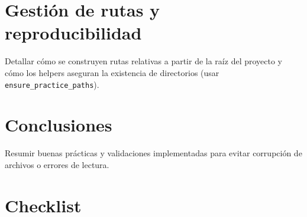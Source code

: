\documentclass[12pt]{article}
\begin{document}
\section{Gestión de rutas y reproducibilidad}
Detallar cómo se construyen rutas relativas a partir de la raíz del proyecto y cómo los helpers aseguran la existencia de directorios (usar \texttt{ensure\_practice\_paths}).

\section{Conclusiones}
Resumir buenas prácticas y validaciones implementadas para evitar corrupción de archivos o errores de lectura.

\section*{Checklist}
\ChecklistBase
\end{document}
